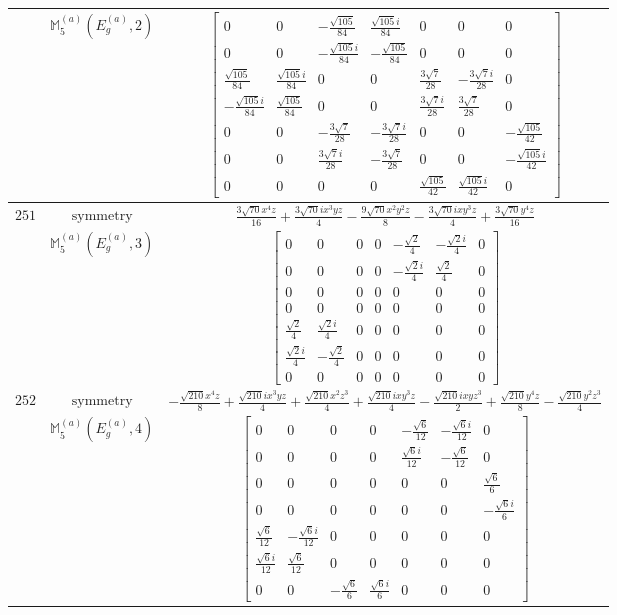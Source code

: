 \documentclass[fleqn,8pt,landscape]{jsarticle}
\begin{document}
\begin{longtable}{ccc}
$  $ & $ \mathbb{M}_{5}^{(a)}(E_{g}^{(a)},2) $ & $ \begin{bmatrix} 0 & 0 & - \frac{\sqrt{105}}{84} & \frac{\sqrt{105} i}{84} & 0 & 0 & 0 \\ 0 & 0 & - \frac{\sqrt{105} i}{84} & - \frac{\sqrt{105}}{84} & 0 & 0 & 0 \\ \frac{\sqrt{105}}{84} & \frac{\sqrt{105} i}{84} & 0 & 0 & \frac{3 \sqrt{7}}{28} & - \frac{3 \sqrt{7} i}{28} & 0 \\ - \frac{\sqrt{105} i}{84} & \frac{\sqrt{105}}{84} & 0 & 0 & \frac{3 \sqrt{7} i}{28} & \frac{3 \sqrt{7}}{28} & 0 \\ 0 & 0 & - \frac{3 \sqrt{7}}{28} & - \frac{3 \sqrt{7} i}{28} & 0 & 0 & - \frac{\sqrt{105}}{42} \\ 0 & 0 & \frac{3 \sqrt{7} i}{28} & - \frac{3 \sqrt{7}}{28} & 0 & 0 & - \frac{\sqrt{105} i}{42} \\ 0 & 0 & 0 & 0 & \frac{\sqrt{105}}{42} & \frac{\sqrt{105} i}{42} & 0 \end{bmatrix} $ \\ \hline
$ 251 $ & $ \text{symmetry} $ & $ \frac{3 \sqrt{70} x^{4} z}{16} + \frac{3 \sqrt{70} i x^{3} y z}{4} - \frac{9 \sqrt{70} x^{2} y^{2} z}{8} - \frac{3 \sqrt{70} i x y^{3} z}{4} + \frac{3 \sqrt{70} y^{4} z}{16} $ \\
$  $ & $ \mathbb{M}_{5}^{(a)}(E_{g}^{(a)},3) $ & $ \begin{bmatrix} 0 & 0 & 0 & 0 & - \frac{\sqrt{2}}{4} & - \frac{\sqrt{2} i}{4} & 0 \\ 0 & 0 & 0 & 0 & - \frac{\sqrt{2} i}{4} & \frac{\sqrt{2}}{4} & 0 \\ 0 & 0 & 0 & 0 & 0 & 0 & 0 \\ 0 & 0 & 0 & 0 & 0 & 0 & 0 \\ \frac{\sqrt{2}}{4} & \frac{\sqrt{2} i}{4} & 0 & 0 & 0 & 0 & 0 \\ \frac{\sqrt{2} i}{4} & - \frac{\sqrt{2}}{4} & 0 & 0 & 0 & 0 & 0 \\ 0 & 0 & 0 & 0 & 0 & 0 & 0 \end{bmatrix} $ \\ \hline
$ 252 $ & $ \text{symmetry} $ & $ - \frac{\sqrt{210} x^{4} z}{8} + \frac{\sqrt{210} i x^{3} y z}{4} + \frac{\sqrt{210} x^{2} z^{3}}{4} + \frac{\sqrt{210} i x y^{3} z}{4} - \frac{\sqrt{210} i x y z^{3}}{2} + \frac{\sqrt{210} y^{4} z}{8} - \frac{\sqrt{210} y^{2} z^{3}}{4} $ \\
$  $ & $ \mathbb{M}_{5}^{(a)}(E_{g}^{(a)},4) $ & $ \begin{bmatrix} 0 & 0 & 0 & 0 & - \frac{\sqrt{6}}{12} & - \frac{\sqrt{6} i}{12} & 0 \\ 0 & 0 & 0 & 0 & \frac{\sqrt{6} i}{12} & - \frac{\sqrt{6}}{12} & 0 \\ 0 & 0 & 0 & 0 & 0 & 0 & \frac{\sqrt{6}}{6} \\ 0 & 0 & 0 & 0 & 0 & 0 & - \frac{\sqrt{6} i}{6} \\ \frac{\sqrt{6}}{12} & - \frac{\sqrt{6} i}{12} & 0 & 0 & 0 & 0 & 0 \\ \frac{\sqrt{6} i}{12} & \frac{\sqrt{6}}{12} & 0 & 0 & 0 & 0 & 0 \\ 0 & 0 & - \frac{\sqrt{6}}{6} & \frac{\sqrt{6} i}{6} & 0 & 0 & 0 \end{bmatrix} $ \\ \hline

\end{longtable}
\end{document}
